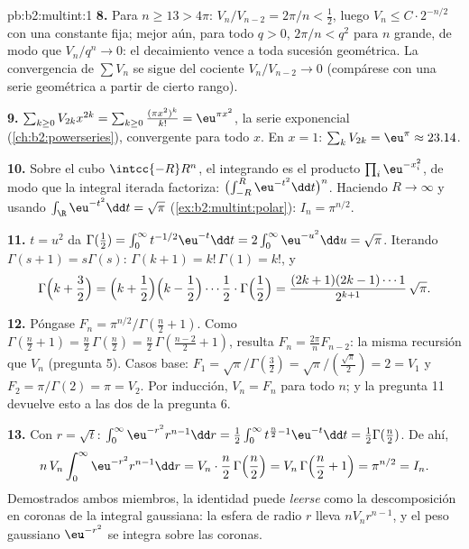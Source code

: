 \begin{solution}{pb:b2:multint:1}
\textbf{8.} Para $n \geq 13 > 4\pi$: $V_n/V_{n-2} = 2\pi/n <
\tfrac12$, luego $V_{n} \leq C\cdot 2^{-n/2}$ con una constante fija;
mejor aún, para todo $q > 0$, $2\pi/n < q^2$ para $n$ grande, de modo
que $V_n/q^n \to 0$: el decaimiento vence a toda sucesión
geométrica. La convergencia de $\sum V_n$ se sigue del cociente
$V_n/V_{n-2} \to 0$ (compárese con una serie geométrica a partir de
cierto rango).

\textbf{9.} $\sum_{k\geq0}V_{2k}x^{2k} = \sum_{k\geq0}\frac{(\pi
x^2)^k}{k!} = \eu^{\pi x^2}$, la serie exponencial
(\cref{ch:b2:powerseries}), convergente para todo $x$. En $x = 1$:
$\sum_kV_{2k} = \eu^\pi \approx 23.14$.

\textbf{10.} Sobre el cubo $\intcc{-R}R^n$, el integrando es el
producto $\prod_i\eu^{-x_i^2}$, de modo que la integral iterada
factoriza: $\bigl(\int_{-R}^R\eu^{-t^2}\dd t\bigr)^n$. Haciendo $R
\to \infty$ y usando $\int_\R\eu^{-t^2}\dd t = \sqrt\pi$
(\cref{ex:b2:multint:polar}): $I_n = \pi^{n/2}$.

\textbf{11.} $t = u^2$ da $\Gamma(\tfrac12) = \int_0^\infty
t^{-1/2}\eu^{-t}\dd t = 2\int_0^\infty\eu^{-u^2}\dd u = \sqrt\pi$.
Iterando $\Gamma(s+1) = s\Gamma(s)$: $\Gamma(k+1) = k!\,\Gamma(1) =
k!$, y
\[
\Gamma\Bigl(k + \frac32\Bigr)
= \Bigl(k + \frac12\Bigr)\Bigl(k - \frac12\Bigr)\cdots
\frac12\cdot\Gamma\Bigl(\frac12\Bigr)
= \frac{(2k+1)(2k-1)\cdots1}{2^{k+1}}\,\sqrt\pi .
\]

\textbf{12.} Póngase $F_n = \pi^{n/2}/\Gamma(\frac n2 + 1)$. Como
$\Gamma(\frac n2 + 1) = \frac n2\,\Gamma(\frac n2) = \frac
n2\,\Gamma(\frac{n-2}2 + 1)$, resulta $F_n = \frac{2\pi}nF_{n-2}$: la
misma recursión que $V_n$ (pregunta 5). Casos base: $F_1 =
\sqrt\pi/\Gamma(\frac32) = \sqrt\pi/(\frac{\sqrt\pi}2) = 2 = V_1$ y
$F_2 = \pi/\Gamma(2) = \pi = V_2$. Por inducción, $V_n = F_n$ para
todo $n$; y la pregunta 11 devuelve esto a las dos
 de la pregunta 6.

\textbf{13.} Con $r = \sqrt t$: $\int_0^\infty \eu^{-r^2}r^{n-1}\dd r
= \frac12\int_0^\infty t^{\frac n2 - 1}\eu^{-t}\dd t =
\frac12\Gamma(\frac n2)$. De ahí,
\[
n\,V_n\int_0^\infty\eu^{-r^2}r^{n-1}\dd r
= V_n\cdot\frac n2\,\Gamma\Bigl(\frac n2\Bigr)
= V_n\,\Gamma\Bigl(\frac n2 + 1\Bigr) = \pi^{n/2} = I_n .
\]
Demostrados ambos miembros, la identidad puede \emph{leerse} como la
descomposición en coronas de la integral gaussiana: la esfera de
radio $r$ lleva  $nV_nr^{n-1}$, y el peso gaussiano
$\eu^{-r^2}$ se integra sobre las coronas.


\end{solution}
